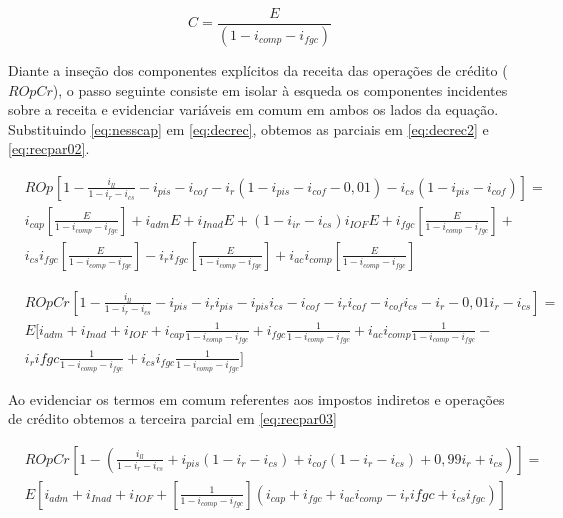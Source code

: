 \documentclass[
  12pt,
  12pt,
  openright,
  oneside,
  a4paper,
  chapter=TITLE,
  section=TITLE,
  subsection=TITLE,
  subsubsection=TITLE,
  english,
  portugues,
  sumario=tradicional]{abntex2}
\begin{document}
\begin{apendicesenv}
\begin{equation}\label{eq:nesscap}
C = \frac{E}{(1 - i_{comp} - i_{fgc})}
\end{equation}


Diante a inseção dos componentes explícitos da receita das operações de crédito ($ROpCr$), o passo seguinte consiste em isolar à esqueda os componentes incidentes sobre a receita e evidenciar variáveis em comum em ambos os lados da equação. Substituindo \autoref{eq:nesscap} em \autoref{eq:decrec}, obtemos as parciais em \autoref{eq:decrec2} e \autoref{eq:recpar02}. 


\begin{equation}\label{eq:decrec2}
\begin{aligned}
& ROp_{} \left[ 1 - \frac{i_{ll}}{1 - i_{r} - i_{cs}} - i_{pis} - i_{cof} - i_{r} (1-i_{pis} - i_{cof} - 0,01) - i_{cs} (1-i_{pis} - i_{cof}) \right] = \\
& i_{cap} \left[ \frac{E}{1 - i_{comp} - i_{fgc}} \right] + i_{adm}E + i_{Inad}E + (1 - i_{ir} - i_{cs})i_{IOF}E + i_{fgc} \left[ \frac{E}{1 - i_{comp} - i_{fgc}} \right] + \\ & i_{cs}i_{fgc}\left[\frac{E}{1 - i_{comp} - i_{fgc}}\right] - 
i_{r}i_{fgc}\left[\frac{E}{1 - i_{comp} - i_{fgc}}\right] + i_{ac}i_{comp}\left[\frac{E}{1 - i_{comp} - i_{fgc}}\right]
\end{aligned}
\end{equation}




\begin{equation}\label{eq:recpar02}
\begin{aligned}
& ROpCr_{}\left[ 1 - \frac{i_{ll}}{1 - i_{r} - i_{cs}} - i_{pis} - i_{r}i_{pis} - i_{pis}i_{cs} - i_{cof} - i_{r}i_{cof} - i_{cof}i_{cs} - i_{r} - 0,01i_{r} - i_{cs}\right] = \\
& E [ i_{adm} + i_{Inad} + i_{IOF} +  i_{cap}\frac{1}{1 - i_{comp} - i_{fgc}} + i_{fgc}\frac{1}{1 - i_{comp} - i_{fgc}} + i_{ac}i_{comp}\frac{1}{1 - i_{comp} - i_{fgc}} - \\
& i_{r}i{fgc}\frac{1}{1 - i_{comp} - i_{fgc}} + i_{cs}i_{fgc}\frac{1}{1 - i_{comp} - i_{fgc}} ]
\end{aligned}
\end{equation}


Ao evidenciar os termos em comum referentes aos impostos indiretos e operações de crédito obtemos a terceira parcial em \autoref{eq:recpar03}



\begin{equation}\label{eq:recpar03}
\begin{aligned}
& ROpCr_{}\left[1 - (\frac{i_{ll}}{1 - i_{r} - i_{cs}} + i_{pis}(1 - i_{r} - i_{cs}) + i_{cof}(1 - i_{r} - i_{cs}) + 0,99i_{r} + i_{cs})\right] = \\
& E\left[i_{adm} + i_{Inad} + i_{IOF} +  [\frac{1}{1 - i_{comp} - i_{fgc}}] (i_{cap} + i_{fgc} + i_{ac}i_{comp} - i_{r}i{fgc}+ i_{cs}i_{fgc})\right]
\end{aligned}
\end{equation}




\end{apendicesenv}
\end{document}
